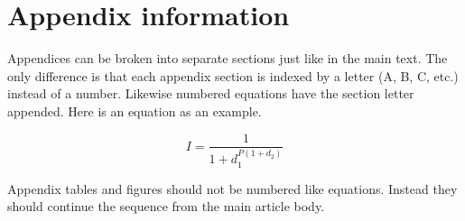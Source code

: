 \documentclass{aastex63}
\begin{document}
\appendix

\section{Appendix information}

Appendices can be broken into separate sections just like in the main text.
The only difference is that each appendix section is indexed by a letter
(A, B, C, etc.) instead of a number.  Likewise numbered equations have
the section letter appended.  Here is an equation as an example.

\begin{equation}
I = \frac{1}{1 + d_{1}^{P (1 + d_{2} )}}
\end{equation}

Appendix tables and figures should not be numbered like equations. Instead
they should continue the sequence from the main article body.



{}



\end{document}
